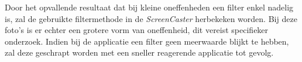 Door het opvallende resultaat dat bij kleine oneffenheden een filter enkel nadelig is, zal de gebruikte filtermethode in de {\it ScreenCaster} herbekeken worden. Bij deze foto's is er echter een grotere vorm van oneffenheid, dit vereist specifieker onderzoek. Indien bij de applicatie een filter geen meerwaarde blijkt te hebben, zal deze geschrapt worden met een sneller reagerende applicatie tot gevolg.